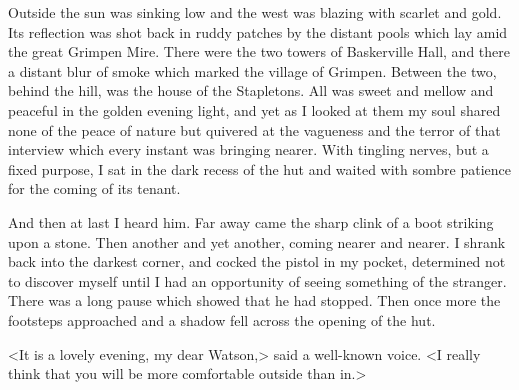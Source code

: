 Outside the sun was sinking low and the west was blazing with scarlet and gold. Its reflection was shot back in ruddy patches by the distant pools which lay amid the great Grimpen Mire. There were the two towers of Baskerville Hall, and there a distant blur of smoke which marked the village of Grimpen. Between the two, behind the hill, was the house of the Stapletons. All was sweet and mellow and peaceful in the golden evening light, and yet as I looked at them my soul shared none of the peace of nature but quivered at the vagueness and the terror of that interview which every instant was bringing nearer. With tingling nerves, but a fixed purpose, I sat in the dark recess of the hut and waited with sombre patience for the coming of its tenant.

And then at last I heard him. Far away came the sharp clink of a boot striking upon a stone. Then another and yet another, coming nearer and nearer. I shrank back into the darkest corner, and cocked the pistol in my pocket, determined not to discover myself until I had an opportunity of seeing something of the stranger. There was a long pause which showed that he had stopped. Then once more the footsteps approached and a shadow fell across the opening of the hut.

<It is a lovely evening, my dear Watson,> said a well-known voice. <I really think that you will be more comfortable outside than in.>

